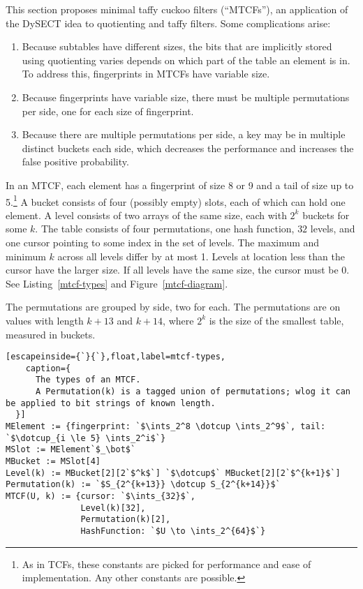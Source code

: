 \documentclass[sigconf]{acmart}
\newcommand{\ints}{\mathbb{Z}}
\newcommand{\dotcup}{\ensuremath{\mathaccent\cdot\cup}}
\begin{document}
This section proposes minimal taffy cuckoo filters (``MTCFs''), an application of the DySECT idea to quotienting and taffy filters.
Some complications arise:

\begin{enumerate}
  \item Because subtables have different sizes, the bits that are implicitly stored using quotienting varies depends on which part of the table an element is in.
    To address this, fingerprints in MTCFs have variable size.
  \item Because fingerprints have variable size, there must be multiple permutations per side, one for each size of fingerprint.
  \item Because there are multiple permutations per side, a key may be in multiple distinct buckets each side, which decreases the performance and increases the false positive probability.
\end{enumerate}

In an MTCF, each element has a fingerprint of size 8 or 9 and a tail of size up to 5.\footnote{As in TCFs, these constants are picked for performance and ease of implementation.
Any other constants are possible.
}
A bucket consists of four (possibly empty) slots, each of which can hold one element.
A level consists of two arrays of the same size, each with $2^k$ buckets for some $k$.
The table consists of four permutations, one hash function, $32$ levels, and one cursor pointing to some index in the set of levels.
The maximum and minimum $k$ across all levels differ by at most 1.
Levels at location less than the cursor have the larger size.
If all levels have the same size, the cursor must be 0.
See Listing~\ref{mtcf-types} and Figure~\ref{mtcf-diagram}.

The permutations are grouped by side, two for each.
The permutations are on values with length $k + 13$ and $k + 14$, where $2^k$ is the size of the smallest table, measured in buckets.

\begin{lstlisting}[escapeinside={`}{`},float,label=mtcf-types,
    caption={
      The types of an MTCF.
      A Permutation(k) is a tagged union of permutations; wlog it can be applied to bit strings of known length.
  }]
MElement := {fingerprint: `$\ints_2^8 \dotcup \ints_2^9$`, tail: `$\dotcup_{i \le 5} \ints_2^i$`}
MSlot := MElement`$_\bot$`
MBucket := MSlot[4]
Level(k) := MBucket[2][2`$^k$`] `$\dotcup$` MBucket[2][2`$^{k+1}$`]
Permutation(k) := `$S_{2^{k+13}} \dotcup S_{2^{k+14}}$`
MTCF(U, k) := {cursor: `$\ints_{32}$`,
               Level(k)[32],
               Permutation(k)[2],
               HashFunction: `$U \to \ints_2^{64}$`}

\end{lstlisting}
\end{document}
